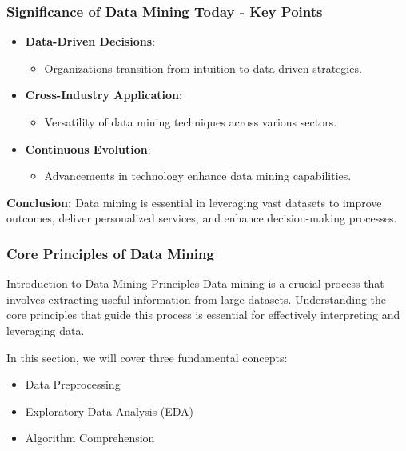 \documentclass{beamer}
\begin{document}
\begin{frame}[fragile]
    \frametitle{Significance of Data Mining Today - Key Points}
    \begin{itemize}
        \item \textbf{Data-Driven Decisions}: 
        \begin{itemize}
            \item Organizations transition from intuition to data-driven strategies.
        \end{itemize}
        \item \textbf{Cross-Industry Application}: 
        \begin{itemize}
            \item Versatility of data mining techniques across various sectors.
        \end{itemize}
        \item \textbf{Continuous Evolution}: 
        \begin{itemize}
            \item Advancements in technology enhance data mining capabilities.
        \end{itemize}
    \end{itemize}
    
    \textbf{Conclusion:} Data mining is essential in leveraging vast datasets to improve outcomes, deliver personalized services, and enhance decision-making processes.
\end{frame}

\begin{frame}[fragile]
    \frametitle{Core Principles of Data Mining}
    \begin{block}{Introduction to Data Mining Principles}
        Data mining is a crucial process that involves extracting useful information from large datasets.  
        Understanding the core principles that guide this process is essential for effectively interpreting and leveraging data.
    \end{block}
    In this section, we will cover three fundamental concepts:
    \begin{itemize}
        \item Data Preprocessing
        \item Exploratory Data Analysis (EDA)
        \item Algorithm Comprehension
    \end{itemize}
\end{frame}
\end{document}
